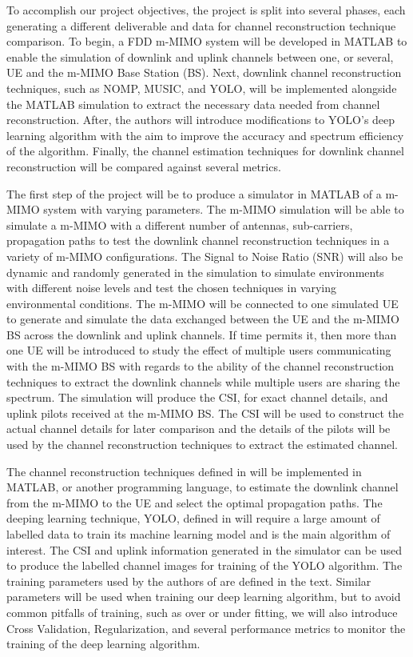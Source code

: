 \fi
To accomplish our project objectives, the project is split into several phases, each generating a different deliverable and data for channel reconstruction technique comparison. To begin, a FDD m-MIMO system will be developed in MATLAB to enable the simulation of downlink and uplink channels between one, or several, UE and the m-MIMO Base Station (BS). Next, downlink channel reconstruction techniques, such as NOMP, MUSIC, and YOLO, will be implemented alongside the MATLAB simulation to extract the necessary data needed from channel reconstruction. After, the authors will introduce modifications to YOLO's deep learning algorithm with the aim to improve the accuracy and spectrum efficiency of the algorithm. Finally, the channel estimation techniques for downlink channel reconstruction will be compared against several metrics.

The first step of the project will be to produce a simulator in MATLAB of a m-MIMO system with varying parameters. The m-MIMO simulation will be able to simulate a m-MIMO with a different number of antennas, sub-carriers, propagation paths to test the downlink channel reconstruction techniques in a variety of m-MIMO configurations. The Signal to Noise Ratio (SNR) will also be dynamic and randomly generated in the simulation to simulate environments with different noise levels and test the chosen techniques in varying environmental conditions. The m-MIMO will be connected to one simulated UE to generate and simulate the data exchanged between the UE and the m-MIMO BS across the downlink and uplink channels. If time permits it, then more than one UE will be introduced to study the effect of multiple users communicating with the m-MIMO BS with regards to the ability of the channel reconstruction techniques to extract the downlink channels while multiple users are sharing the spectrum. The simulation will produce the CSI, for exact channel details, and uplink pilots received at the m-MIMO BS. The CSI will be used to construct the actual channel details for later comparison and the details of the pilots will be used by the channel reconstruction techniques to extract the estimated channel.

The channel reconstruction techniques defined in \cite{Li2020} will be implemented in MATLAB, or another programming language, to estimate the downlink channel from the m-MIMO to the UE and select the optimal propagation paths. The deeping learning technique, YOLO, defined in \cite{Li2020} will require a large amount of labelled data to train its machine learning model and is the main algorithm of interest. The CSI and uplink information generated in the simulator can be used to produce the labelled channel images for training of the YOLO algorithm. The training parameters used by the authors of \cite{Li2020} are defined in the text. Similar parameters will be used when training our deep learning algorithm, but to avoid common pitfalls of training, such as over or under fitting, we will also introduce Cross Validation, Regularization, and several performance metrics to monitor the training of the deep learning algorithm.

